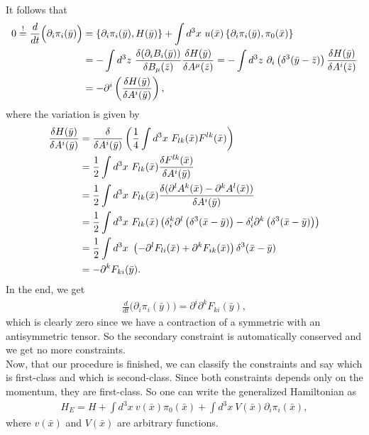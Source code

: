 It follows that
\begin{align}
0 \overset{!}{=} \frac{d}{dt} \Big( \partial_i \pi_i(\bar{y}) \Big) &= \left \{ \partial_i \pi_i(\bar{y}),H(\bar{y}) \right \} + \int d^3 x \ u(\bar{x}) \left \{ \partial_i \pi_i(\bar{y}),\pi_0(\bar{x}) \right \} \notag \\
&= - \int d^3 z \ \frac{\delta (\partial_i B_i(\bar{y}))}{\delta B_{\mu}(\bar{z})} \frac{\delta H(\bar{y})}{\delta A^{\mu}(\bar{z})} = - \int d^3 z \  \partial_i \left(\delta^3(\bar{y} - \bar{z})\right) \frac{\delta H(\bar{y})}{\delta A^i(\bar{z})} \notag \\
&= - \partial^i \left( \frac{\delta H(\bar{y})}{\delta A^i(\bar{y})} \right),
\end{align}
where the variation is given by 
\begin{align}
\frac{\delta H(\bar{y})}{\delta A^i(\bar{y})} &= \frac{\delta}{\delta A^i(\bar{y})} \left( \frac{1}{4} \int d^3 x \ F_{lk}(\bar{x})F^{lk}(\bar{x}) \right) \notag \\
&= \frac{1}{2} \int d^3 x \ F_{lk}(\bar{x}) \frac{\delta F^{lk}(\bar{x})}{\delta A^i(\bar{y})} \notag \\
&= \frac{1}{2} \int d^3 x \ F_{lk}(\bar{x}) \frac{\delta (\partial^l A^k(\bar{x}) - \partial^k A^l(\bar{x}))}{\delta A^i(\bar{y})} \notag \\
&= \frac{1}{2} \int d^3 x \ F_{lk}(\bar{x}) \left( \delta_i^k  \partial^l \left(\delta^3(\bar{x} - \bar{y})\right) - \delta_i^l  \partial^k \left(\delta^3(\bar{x} - \bar{y})\right) \right) \notag \\
&= \frac{1}{2} \int d^3 x \ \left( - \partial^l F_{li}(\bar{x}) + \partial^k F_{ik}(\bar{x}) \right) \delta^3(\bar{x} - \bar{y}) \notag \\
&= - \partial^k F_{ki}(\bar{y}).
\end{align}
In the end, we get
\begin{align}
\frac{d}{dt} \Big( \partial_i \pi_i(\bar{y}) \Big) = \partial^i \partial^k F_{ki}(\bar{y}),
\end{align}
which is clearly zero since we have a contraction of a symmetric with an antisymmetric tensor. So the secondary constraint is automatically conserved and we get no more constraints. \\

Now, that our procedure is finished, we can classify the constraints and say which is first-class and which is second-class.
Since both constraints depends only on the momentum, they are first-class. So one can write the generalized Hamiltonian as
\begin{align}
H_E = H + \int d^3 x \ v(\bar{x}) \pi_0(\bar{x}) + \int d^3 x \ V(\bar{x}) \partial_i \pi_i(\bar{x}),
\end{align}
where $v(\bar{x})$ and $V(\bar{x})$ are arbitrary functions. \\


